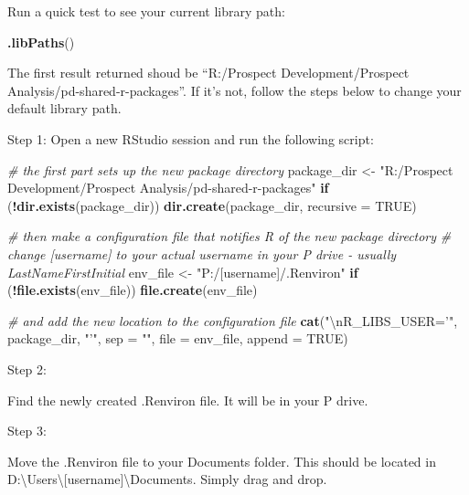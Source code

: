 \documentclass[]{book}
\newenvironment{Shaded}{\begin{snugshade}}{\end{snugshade}}
\newcommand{\CharTok}[1]{\textcolor[rgb]{0.31,0.60,0.02}{#1}}
\newcommand{\CommentTok}[1]{\textcolor[rgb]{0.56,0.35,0.01}{\textit{#1}}}
\newcommand{\ControlFlowTok}[1]{\textcolor[rgb]{0.13,0.29,0.53}{\textbf{#1}}}
\newcommand{\DataTypeTok}[1]{\textcolor[rgb]{0.13,0.29,0.53}{#1}}
\newcommand{\KeywordTok}[1]{\textcolor[rgb]{0.13,0.29,0.53}{\textbf{#1}}}
\newcommand{\NormalTok}[1]{#1}
\newcommand{\OperatorTok}[1]{\textcolor[rgb]{0.81,0.36,0.00}{\textbf{#1}}}
\newcommand{\OtherTok}[1]{\textcolor[rgb]{0.56,0.35,0.01}{#1}}
\newcommand{\StringTok}[1]{\textcolor[rgb]{0.31,0.60,0.02}{#1}}
\begin{document}
Run a quick test to see your current library path:

\begin{Shaded}
\begin{Highlighting}[]
\KeywordTok{.libPaths}\NormalTok{()}
\end{Highlighting}
\end{Shaded}

The first result returned shoud be ``R:/Prospect Development/Prospect Analysis/pd-shared-r-packages''. If it's not, follow the steps below to change your default library path.

Step 1: Open a new RStudio session and run the following script:

\begin{Shaded}
\begin{Highlighting}[]
\CommentTok{# the first part sets up the new package directory}
\NormalTok{package_dir <-}\StringTok{ "R:/Prospect Development/Prospect Analysis/pd-shared-r-packages"}
\ControlFlowTok{if}\NormalTok{ (}\OperatorTok{!}\KeywordTok{dir.exists}\NormalTok{(package_dir)) }\KeywordTok{dir.create}\NormalTok{(package_dir, }\DataTypeTok{recursive =} \OtherTok{TRUE}\NormalTok{)}

\CommentTok{# then make a configuration file that notifies R of the new package directory}
\CommentTok{# change [username] to your actual username in your P drive - usually LastNameFirstInitial}
\NormalTok{env_file <-}\StringTok{ "P:/[username]/.Renviron"}
\ControlFlowTok{if}\NormalTok{ (}\OperatorTok{!}\KeywordTok{file.exists}\NormalTok{(env_file)) }\KeywordTok{file.create}\NormalTok{(env_file)}

\CommentTok{# and add the new location to the configuration file}
\KeywordTok{cat}\NormalTok{(}\StringTok{"}\CharTok{\textbackslash{}n}\StringTok{R_LIBS_USER='"}\NormalTok{, package_dir, }\StringTok{"'"}\NormalTok{, }
    \DataTypeTok{sep =} \StringTok{""}\NormalTok{, }\DataTypeTok{file =}\NormalTok{ env_file, }\DataTypeTok{append =} \OtherTok{TRUE}\NormalTok{)}
\end{Highlighting}
\end{Shaded}

Step 2:

Find the newly created .Renviron file. It will be in your P drive.

Step 3:

Move the .Renviron file to your Documents folder. This should be located in D:\textbackslash Users\textbackslash{[}username{]}\textbackslash Documents. Simply drag and drop.
\end{document}
